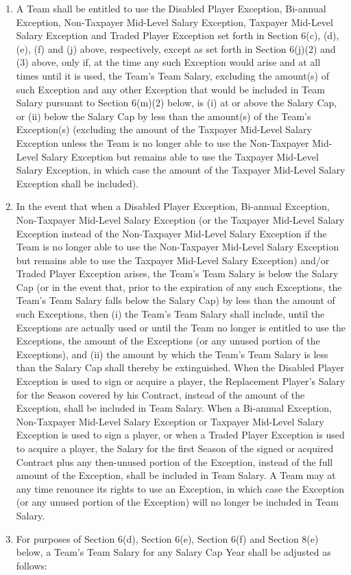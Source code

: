 \documentclass[
]{book}
\providecommand{\tightlist}{%
  \setlength{\itemsep}{0pt}\setlength{\parskip}{0pt}}
\begin{document}
\begin{enumerate}
  \begin{enumerate}
  \def\labelenumii{(\arabic{enumii})}
  \tightlist
  \item
    A Team shall be entitled to use the Disabled Player Exception, Bi-annual Exception, Non-Taxpayer Mid-Level Salary Exception, Taxpayer Mid-Level Salary Exception and Traded Player Exception set forth in Section 6(c), (d), (e), (f) and (j) above, respectively, except as set forth in Section 6(j)(2) and (3) above, only if, at the time any such Exception would arise and at all times until it is used, the Team's Team Salary, excluding the amount(s) of such Exception and any other Exception that would be included in Team Salary pursuant to Section 6(m)(2) below, is (i) at or above the Salary Cap, or (ii) below the Salary Cap by less than the amount(s) of the Team's Exception(s) (excluding the amount of the Taxpayer Mid-Level Salary Exception unless the Team is no longer able to use the Non-Taxpayer Mid-Level Salary Exception but remains able to use the Taxpayer Mid-Level Salary Exception, in which case the amount of the Taxpayer Mid-Level Salary Exception shall be included).
  \item
    In the event that when a Disabled Player Exception, Bi-annual Exception, Non-Taxpayer Mid-Level Salary Exception (or the Taxpayer Mid-Level Salary Exception instead of the Non-Taxpayer Mid-Level Salary Exception if the Team is no longer able to use the Non-Taxpayer Mid-Level Salary Exception but remains able to use the Taxpayer Mid-Level Salary Exception) and/or Traded Player Exception arises, the Team's Team Salary is below the Salary Cap (or in the event that, prior to the expiration of any such Exceptions, the Team's Team Salary falls below the Salary Cap) by less than the amount of such Exceptions, then (i) the Team's Team Salary shall include, until the Exceptions are actually used or until the Team no longer is entitled to use the Exceptions, the amount of the Exceptions (or any unused portion of the Exceptions), and (ii) the amount by which the Team's Team Salary is less than the Salary Cap shall thereby be extinguished. When the Disabled Player Exception is used to sign or acquire a player, the Replacement Player's Salary for the Season covered by his Contract, instead of the amount of the Exception, shall be included in Team Salary. When a Bi-annual Exception, Non-Taxpayer Mid-Level Salary Exception or Taxpayer Mid-Level Salary Exception is used to sign a player, or when a Traded Player Exception is used to acquire a player, the Salary for the first Season of the signed or acquired Contract plus any then-unused portion of the Exception, instead of the full amount of the Exception, shall be included in Team Salary. A Team may at any time renounce its rights to use an Exception, in which case the Exception (or any unused portion of the Exception) will no longer be included in Team Salary.
  \item
    For purposes of Section 6(d), Section 6(e), Section 6(f) and Section 8(e) below, a Team's Team Salary for any Salary Cap Year shall be adjusted as follows:


\end{enumerate}
\end{enumerate}
\end{document}
